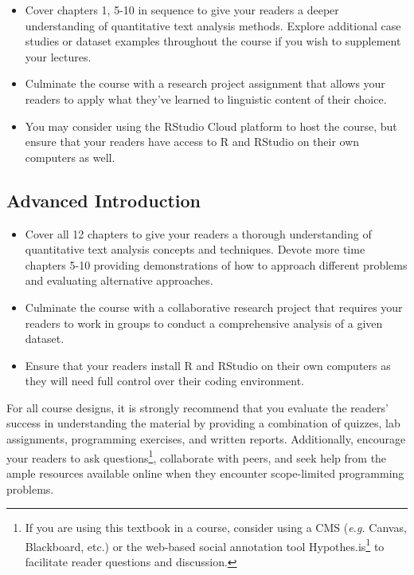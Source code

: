 \documentclass[
  letterpaper,
  DIV=11,
  numbers=noendperiod]{scrreport}
\providecommand{\tightlist}{%
  \setlength{\itemsep}{0pt}\setlength{\parskip}{0pt}}\usepackage{longtable,booktabs,array}
\theoremstyle{definition}
\theoremstyle{remark}
\DeclareRobustCommand{\href}[2]{#2\footnote{\url{#1}}}
\begin{document}
\begin{itemize}
\tightlist
\item
  Cover chapters 1, 5-10 in sequence to give your readers a deeper
  understanding of quantitative text analysis methods. Explore
  additional case studies or dataset examples throughout the course if
  you wish to supplement your lectures.
\item
  Culminate the course with a research project assignment that allows
  your readers to apply what they've learned to linguistic content of
  their choice.
\item
  You may consider using the RStudio Cloud platform to host the course,
  but ensure that your readers have access to R and RStudio on their own
  computers as well.
\end{itemize}

\hypertarget{sec-p-advanced-intro}{%
\subsection*{Advanced Introduction}\label{sec-p-advanced-intro}}

\begin{itemize}
\tightlist
\item
  Cover all 12 chapters to give your readers a thorough understanding of
  quantitative text analysis concepts and techniques. Devote more time
  chapters 5-10 providing demonstrations of how to approach different
  problems and evaluating alternative approaches.
\item
  Culminate the course with a collaborative research project that
  requires your readers to work in groups to conduct a comprehensive
  analysis of a given dataset.
\item
  Ensure that your readers install R and RStudio on their own computers
  as they will need full control over their coding environment.
\end{itemize}

For all course designs, it is strongly recommend that you evaluate the
readers' success in understanding the material by providing a
combination of quizzes, lab assignments, programming exercises, and
written reports. Additionally, encourage your readers to ask
questions\footnote{If you are using this textbook in a course, consider
  using a CMS (\emph{e.g.} Canvas, Blackboard, etc.) or the web-based
  social annotation tool \href{https://hypothes.is/}{Hypothes.is} to
  facilitate reader questions and discussion.}, collaborate with peers,
and seek help from the ample resources available online when they
encounter scope-limited programming problems.
\end{document}
